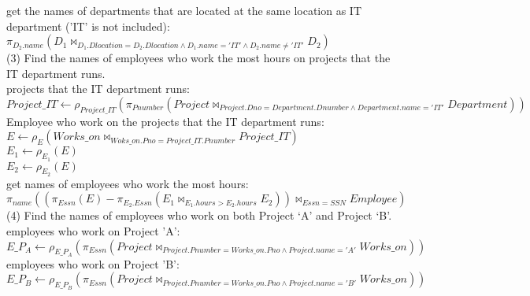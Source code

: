\documentclass[]{article}
\begin{document}
	get the names of departments that are located at the same location as IT department ('IT' is not included):\\
	
	$\pi_{D_{2}.name}(D_{1}\bowtie_{D_{1}.Dlocation=D_{2}.Dlocation\wedge D_{1}.name='IT'\wedge D_{2}.name\neq'IT'} D_{2})$\\
	
	\noindent(3) Find the names of employees who work the most hours on projects that the IT 
	department runs.\\
	
	projects that the IT department runs:\\	
	
	$Project\_IT\leftarrow \rho_{Project\_IT}(\pi_{Pnumber}(Project\bowtie_{Project.Dno=Department.Dnumber\wedge Department.name='IT'} Department))$\\
	
	Employee who work on the projects that the IT department runs:\\
	
	$E\leftarrow \rho_{E}(Works\_on\bowtie_{Woks\_on.Pno=Project\_IT.Pnumber} Project\_IT)$\\
	
	$E_{1}\leftarrow \rho_{E_{1}}(E)$\\
	
	$E_{2}\leftarrow \rho_{E_{2}}(E)$\\
	
	get names of employees who work the most hours:\\
	
	$\pi_{name}((\pi_{Essn}(E)-\pi_{E_{2}.Essn}(E_{1}\bowtie_{E_{1}.hours>E_{2}.hours}E_{2}))\bowtie_{Essn=SSN} Employee)$\\
	
	\noindent(4) Find the names of employees who work on both Project ‘A’ and Project ‘B’.\\
	
	employees who work on Project 'A':\\
	
	$E\_P_{A}\leftarrow \rho_{E\_P_{A}}(\pi_{Essn}(Project\bowtie_{Project.Pnumber=Works\_on.Pno\wedge Project.name='A'} Works\_on))$\\
	
	employees who work on Project 'B':\\
	
	$E\_P_{B}\leftarrow \rho_{E\_P_{B}}(\pi_{Essn}(Project\bowtie_{Project.Pnumber=Works\_on.Pno\wedge Project.name='B'} Works\_on))$\\
	
\end{document}
